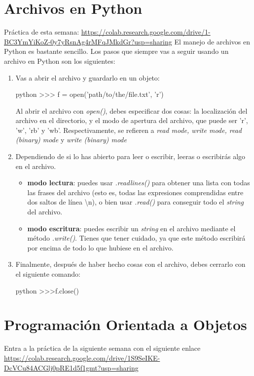 \documentclass{article}
\begin{document}
\section{Archivos en Python}
Práctica de esta semana: \url{https://colab.research.google.com/drive/1-BC3YmYiKoZ-0y7yRsnAg4rMFqJMkdGr?usp=sharing}
El manejo de archivos en Python es bastante sencillo. Los pasos que siempre vas a seguir usando un archivo en Python son los siguientes:
\begin{enumerate}
    \item Vas a abrir el archivo y guardarlo en un objeto:
    \begin{mintedbox}{python}
    >>> f = open('path/to/the/file.txt', 'r')
    \end{mintedbox}
    Al abrir el archivo con \textit{open()}, debes especificar dos cosas: la localización del archivo en el directorio, y el modo de apertura del archivo, que puede ser 'r', 'w', 'rb' y 'wb'. Respectivamente, se refieren a \textit{read mode, write mode, read (binary) mode} y \textit{write (binary) mode}
    \item Dependiendo de si lo has abierto para leer o escribir, leeras o escribirás algo en el archivo.
    \begin{itemize}
        \item \textbf{modo lectura}: puedes usar \textit{.readlines()} para obtener una lista con todas las frases del archivo (esto es, todas las expresiones comprendidas entre dos saltos de línea \textbackslash n), o bien usar \textit{.read()} para conseguir todo el \textit{string} del archivo.
        \item \textbf{modo escritura}: puedes escribir un \textit{string} en el archivo mediante el método \textit{.write()}. Tienes que tener cuidado, ya que este método escribirá por encima de todo lo que hubiese en el archivo.
        
    \end{itemize}
    \item Finalmente, después de haber hecho cosas con el archivo, debes cerrarlo con el siguiente comando:
    \begin{mintedbox}{python}
    >>>f.close()
    \end{mintedbox}
\end{enumerate}
\section{Programación Orientada a Objetos}
Entra a la práctica de la siguiente semana con el siguiente enlace \url{https://colab.research.google.com/drive/1S9SeIKE-DcVCu84ACGlj0pRE1d5f1gmt?usp=sharing}
\end{document}
